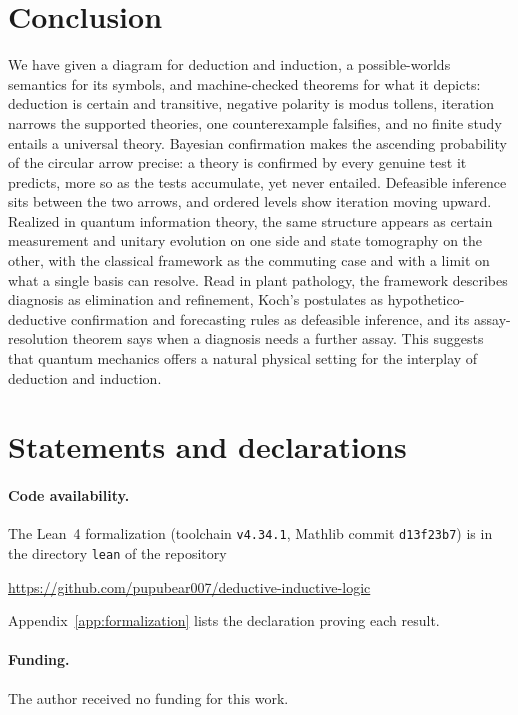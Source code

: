 \section{Conclusion}

We have given a diagram for deduction and induction, a possible-worlds semantics for its symbols,
and machine-checked theorems for what it depicts: deduction is certain and transitive, negative
polarity is modus tollens, iteration narrows the supported theories, one counterexample falsifies,
and no finite study entails a universal theory. Bayesian confirmation makes the ascending
probability of the circular arrow precise: a theory is confirmed by every genuine test it
predicts, more so as the tests accumulate, yet never entailed. Defeasible inference sits between
the two arrows, and ordered levels show iteration moving upward. Realized in quantum information
theory, the same structure appears as certain measurement and unitary evolution on one side and
state tomography on the other, with the classical framework as the commuting case and with a
limit on what a single basis can resolve. Read in plant pathology, the framework describes
diagnosis as elimination and refinement, Koch's postulates as hypothetico-deductive
confirmation and forecasting rules as defeasible inference, and its assay-resolution theorem says
when a diagnosis needs a further assay. This suggests that quantum
mechanics offers a natural physical setting for the interplay of deduction and induction.

\section*{Statements and declarations}

\paragraph{Code availability.} The Lean~4 formalization (toolchain \texttt{v4.34.1}, Mathlib
commit \texttt{d13f23b7}) is in the directory \texttt{lean} of the repository
\begin{center}\url{https://github.com/pupubear007/deductive-inductive-logic}\end{center}
Appendix~\ref{app:formalization} lists the declaration proving each result.

\paragraph{Funding.} The author received no funding for this work.

